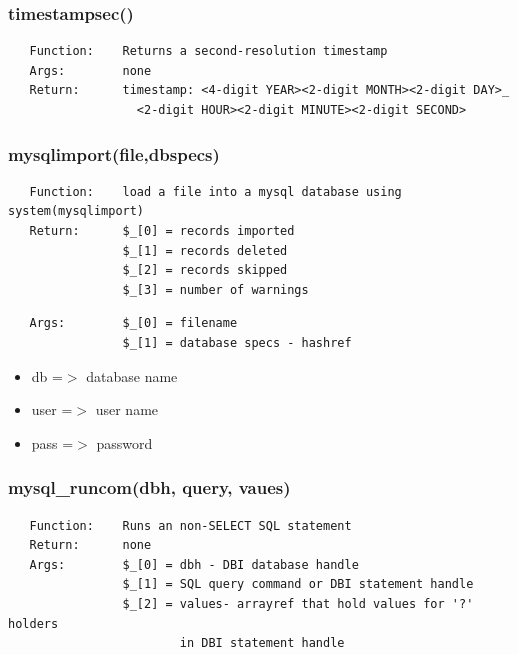 \documentclass{article}
\begin{document}
\subsubsection*{timestampsec()\label{pibase_pm_timestampsec_}}
\begin{verbatim}
   Function:    Returns a second-resolution timestamp
   Args:        none
   Return:      timestamp: <4-digit YEAR><2-digit MONTH><2-digit DAY>_
                  <2-digit HOUR><2-digit MINUTE><2-digit SECOND>
\end{verbatim}
\subsubsection*{mysqlimport(file,dbspecs)\label{pibase_pm_mysqlimport_file_dbspecs_}}
\begin{verbatim}
   Function:    load a file into a mysql database using system(mysqlimport)
   Return:      $_[0] = records imported
                $_[1] = records deleted
                $_[2] = records skipped
                $_[3] = number of warnings
\end{verbatim}
\begin{verbatim}
   Args:        $_[0] = filename
                $_[1] = database specs - hashref
\end{verbatim}
\begin{itemize}

\item db =$>$ database name
\item user =$>$ user name
\item pass =$>$ password\end{itemize}
\subsubsection*{mysql\_runcom(dbh, query, vaues)\label{pibase_pm_mysql_runcom_dbh_query_vaues_}}
\begin{verbatim}
   Function:    Runs an non-SELECT SQL statement
   Return:      none
   Args:        $_[0] = dbh - DBI database handle
                $_[1] = SQL query command or DBI statement handle
                $_[2] = values- arrayref that hold values for '?' holders
                        in DBI statement handle
\end{verbatim}
\end{document}
